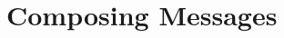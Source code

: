 \documentclass[a4paper,10pt,twoside]{book}
\begin{document}
    \sloppy
\fi

\chapter{Composing Messages}\label{cha:composingMessages}


% 
% 
% 
\end{document}

